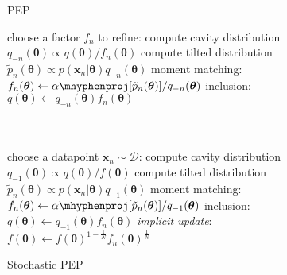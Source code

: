 \documentclass{article} %
\begin{document}
\begin{figure}[!t]
\begin{minipage}[t]{0.45\linewidth}
\centering
\begin{algorithm}[H] 
\caption{PEP} \small
\label{alg:pep} 
\begin{algorithmic}[1] 
	\STATE choose a factor $f_n$ to refine:
	\STATE compute cavity distribution \\$q_{-n}(\bm{\theta}) \propto q(\bm{\theta}) / f_n(\bm{\theta})$ 
	\STATE compute tilted distribution \\$\tilde{p}_n(\bm{\theta}) \propto p(\bm{x}_n|\bm{\theta}) q_{-n}(\bm{\theta})$
	\STATE moment matching: \\ \hspace{-1mm}$f_n(\bm{\theta}) \leftarrow \mathtt{\alpha \mhyphen proj}[\tilde{p}_n(\bm{\theta})] / q_{-n}(\bm{\theta}) $
	\STATE inclusion:\\ $q(\bm{\theta}) \leftarrow q_{-n}(\bm{\theta}) f_n(\bm{\theta})$\\\hspace{1mm}\\ \vspace{1.5mm} \hspace{1mm}\\
\end{algorithmic}
\end{algorithm}
\end{minipage}
%
\quad
%
\begin{minipage}[t]{0.45\linewidth}
\centering
\begin{algorithm}[H]
\caption{Stochastic PEP} \small
\label{alg:spep} 
\begin{algorithmic}[1] 
	\STATE choose a datapoint $\bm{x}_n\sim \mathcal{D}$:
	\STATE compute cavity distribution \\ $q_{-1}(\bm{\theta}) \propto q(\bm{\theta}) / f(\bm{\theta})$
	\STATE compute tilted distribution \\$\tilde{p}_n(\bm{\theta}) \propto p(\bm{x}_n|\bm{\theta}) q_{-1}(\bm{\theta})$
	\STATE moment matching: \\\hspace{-1mm}$f_n(\bm{\theta}) \leftarrow \mathtt{\alpha \mhyphen proj}[\tilde{p}_n(\bm{\theta})] / q_{-1}(\bm{\theta}) $
	\STATE inclusion:\\ $q(\bm{\theta}) \leftarrow q_{-1}(\bm{\theta}) f_n(\bm{\theta})$
	\STATE \textit{implicit update}:\\ $f(\bm{\theta}) \leftarrow f(\bm{\theta})^{1 - \frac{1}{N}} f_n(\bm{\theta})^{\frac{1}{N}}$
\end{algorithmic}
\end{algorithm}
\end{minipage} 
%
\end{figure}
\end{document}
